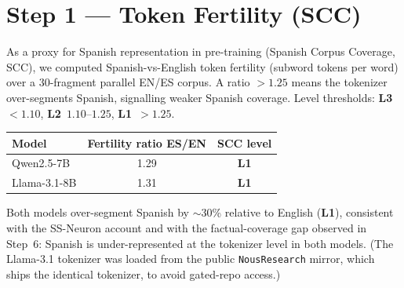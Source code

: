 \documentclass[11pt,a4paper]{article}
\newcommand{\lvlone}{\textcolor{l1red}{\textbf{L1}}}
\newcommand{\lvltwo}{\textcolor{l2yellow}{\textbf{L2}}}
\newcommand{\lvlthree}{\textcolor{l3green}{\textbf{L3}}}
\begin{document}
\appendix
\section{Step 1 --- Token Fertility (SCC)}

As a proxy for Spanish representation in pre-training (Spanish Corpus Coverage, SCC),
we computed Spanish-vs-English token fertility (subword tokens per word) over a
30-fragment parallel EN/ES corpus. A ratio $>1.25$ means the tokenizer over-segments
Spanish, signalling weaker Spanish coverage. Level thresholds:
\lvlthree~$<1.10$, \lvltwo~$1.10$--$1.25$, \lvlone~$>1.25$.

\begin{center}
\begin{tabular}{lcc}
  \toprule
  \textbf{Model} & \textbf{Fertility ratio ES/EN} & \textbf{SCC level} \\
  \midrule
  Qwen2.5-7B    & 1.29 & \lvlone \\
  Llama-3.1-8B  & 1.31 & \lvlone \\
  \bottomrule
\end{tabular}
\end{center}

Both models over-segment Spanish by $\sim$30\% relative to English (\lvlone),
consistent with the SS-Neuron account and with the factual-coverage gap observed in
Step~6: Spanish is under-represented at the tokenizer level in both models. (The
Llama-3.1 tokenizer was loaded from the public \texttt{NousResearch} mirror, which
ships the identical tokenizer, to avoid gated-repo access.)
\end{document}
